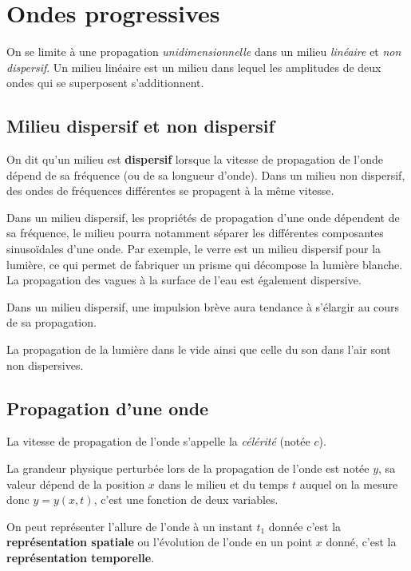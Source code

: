 \documentclass[MPSI]{cours}
\begin{document}
\section{Ondes progressives}
On se limite à une propagation \emph{unidimensionnelle} dans un milieu \emph{linéaire} et \emph{non dispersif}.
Un milieu linéaire est un milieu dans lequel les amplitudes de deux ondes qui se superposent s'additionnent. 

\subsection{Milieu dispersif et non dispersif}%
\label{sub:milieu_dispersif_et_non_dispersif}
On dit qu'un milieu est \textbf{dispersif} lorsque la vitesse de propagation de l'onde dépend de sa fréquence (ou de sa longueur d'onde). Dans un milieu non dispersif, des ondes de fréquences différentes se propagent à la même vitesse.

Dans un milieu dispersif, les propriétés de propagation d'une onde dépendent de sa fréquence, le milieu pourra notamment séparer les différentes composantes sinusoïdales d'une onde. Par exemple, le verre est un milieu dispersif pour la lumière, ce qui permet de fabriquer un prisme qui décompose la lumière blanche. La propagation des vagues à la surface de l'eau est également dispersive.

Dans un milieu dispersif, une impulsion brève aura tendance à s'élargir au cours de sa propagation.

La propagation de la lumière dans le vide ainsi que celle du son dans l'air sont non dispersives.

\subsection{Propagation d'une onde}%
\label{sub:propagation_d_une_onde}



La vitesse de propagation de l'onde s'appelle la \emph{célérité} (notée $c$).

La grandeur physique perturbée lors de la propagation de l'onde est notée $y$, sa valeur dépend de la position $x$ dans le milieu et du temps $t$ auquel on la mesure donc $y=y(x,t)$, c'est une fonction de deux variables. 

On peut représenter l'allure de l'onde à un instant $t_1$ donnée c'est la \textbf{représentation spatiale} ou l'évolution de l'onde en un point $x$ donné, c'est la \textbf{représentation temporelle}.
\end{document}
